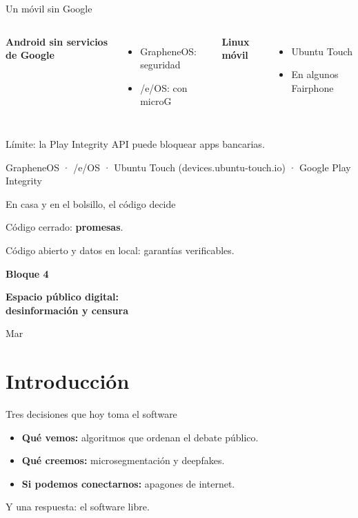 \documentclass[aspectratio=169,12pt]{beamer}
\newcommand{\bloque}[3]{%
  \begin{frame}[plain]
    \vfill
    \begin{center}
      {\color{terra}\large\bfseries Bloque #1}\\[0.3cm]
      {\color{azul}\LARGE\bfseries #2\par}\vspace{0.5cm}
      {\large #3}
    \end{center}
    \vfill
  \end{frame}}
\newcommand{\fuente}[1]{\vfill{\small\color{gris}#1\par}}
\begin{document}
\begin{frame}{Un móvil sin Google}
  \begin{columns}[T]
      \begin{center}{\large\bfseries\color{azul}Android sin servicios de Google}\end{center}
      \begin{itemize}
        \item GrapheneOS: seguridad
        \item /e/OS: con microG
      \end{itemize}
      \begin{center}{\large\bfseries\color{terra}Linux móvil}\end{center}
      \begin{itemize}
        \item Ubuntu Touch
        \item En algunos Fairphone
      \end{itemize}
  \end{columns}
  \vspace{0.3cm}
  {\large\alert{Límite: la Play Integrity API puede bloquear apps bancarias.}}
  \fuente{GrapheneOS · /e/OS · Ubuntu Touch (devices.ubuntu-touch.io) · Google Play Integrity}
\end{frame}

\begin{frame}{En casa y en el bolsillo, el código decide}
  \vspace{0.3cm}
  {\Large Código cerrado: \alert{\textbf{promesas}}.\par}
  \vspace{0.8cm}
  {\Large Código abierto y datos en local: garantías verificables.\par}
\end{frame}


\bloque{4}{Espacio público digital:\\desinformación y censura}{Mar}

\section{Introducción}
\begin{frame}{Tres decisiones que hoy toma el software}
  \begin{itemize}
    \item \textbf{Qué vemos:} algoritmos que ordenan el debate público.
    \item \textbf{Qué creemos:} microsegmentación y deepfakes.
    \item \textbf{Si podemos conectarnos:} apagones de internet.
  \end{itemize}
  \vspace{0.5cm}
  {\large\alert{Y una respuesta: el software libre.}}
\end{frame}
\end{document}
